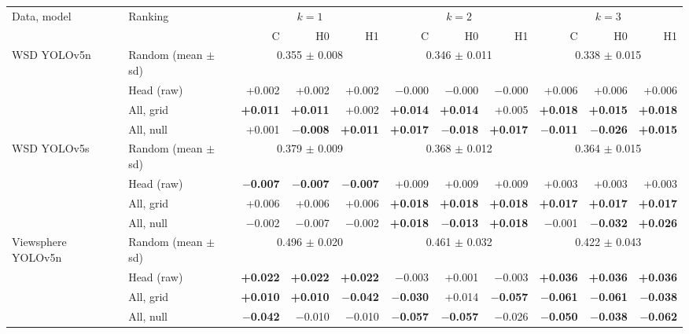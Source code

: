 \begin{tabular}{llrrrrrrrrr}
\toprule
Data, model & Ranking & \multicolumn{3}{c}{$k=1$} & \multicolumn{3}{c}{$k=2$} & \multicolumn{3}{c}{$k=3$} \\
\cmidrule(lr){3-5}\cmidrule(lr){6-8}\cmidrule(lr){9-11}
 & & C & H0 & H1 & C & H0 & H1 & C & H0 & H1 \\
\midrule
WSD YOLOv5n & Random (mean $\pm$ sd) & \multicolumn{3}{c}{0.355 $\pm$ 0.008} & \multicolumn{3}{c}{0.346 $\pm$ 0.011} & \multicolumn{3}{c}{0.338 $\pm$ 0.015} \\
 & Head (raw) & +0.002 & +0.002 & +0.002 & $-$0.000 & $-$0.000 & $-$0.000 & +0.006 & +0.006 & +0.006 \\
 & All, grid & \textbf{+0.011} & \textbf{+0.011} & +0.002 & \textbf{+0.014} & \textbf{+0.014} & +0.005 & \textbf{+0.018} & \textbf{+0.015} & \textbf{+0.018} \\
 & All, null & +0.001 & \textbf{$-$0.008} & \textbf{+0.011} & \textbf{+0.017} & \textbf{$-$0.018} & \textbf{+0.017} & \textbf{$-$0.011} & \textbf{$-$0.026} & \textbf{+0.015} \\
\midrule
WSD YOLOv5s & Random (mean $\pm$ sd) & \multicolumn{3}{c}{0.379 $\pm$ 0.009} & \multicolumn{3}{c}{0.368 $\pm$ 0.012} & \multicolumn{3}{c}{0.364 $\pm$ 0.015} \\
 & Head (raw) & \textbf{$-$0.007} & \textbf{$-$0.007} & \textbf{$-$0.007} & +0.009 & +0.009 & +0.009 & +0.003 & +0.003 & +0.003 \\
 & All, grid & +0.006 & +0.006 & +0.006 & \textbf{+0.018} & \textbf{+0.018} & \textbf{+0.018} & \textbf{+0.017} & \textbf{+0.017} & \textbf{+0.017} \\
 & All, null & $-$0.002 & $-$0.007 & $-$0.002 & \textbf{+0.018} & \textbf{$-$0.013} & \textbf{+0.018} & $-$0.001 & \textbf{$-$0.032} & \textbf{+0.026} \\
\midrule
Viewsphere YOLOv5n & Random (mean $\pm$ sd) & \multicolumn{3}{c}{0.496 $\pm$ 0.020} & \multicolumn{3}{c}{0.461 $\pm$ 0.032} & \multicolumn{3}{c}{0.422 $\pm$ 0.043} \\
 & Head (raw) & \textbf{+0.022} & \textbf{+0.022} & \textbf{+0.022} & $-$0.003 & +0.001 & $-$0.003 & \textbf{+0.036} & \textbf{+0.036} & \textbf{+0.036} \\
 & All, grid & \textbf{+0.010} & \textbf{+0.010} & \textbf{$-$0.042} & \textbf{$-$0.030} & +0.014 & \textbf{$-$0.057} & \textbf{$-$0.061} & \textbf{$-$0.061} & \textbf{$-$0.038} \\
 & All, null & \textbf{$-$0.042} & $-$0.010 & $-$0.010 & \textbf{$-$0.057} & \textbf{$-$0.057} & $-$0.026 & \textbf{$-$0.050} & \textbf{$-$0.038} & \textbf{$-$0.062} \\

\end{tabular}
